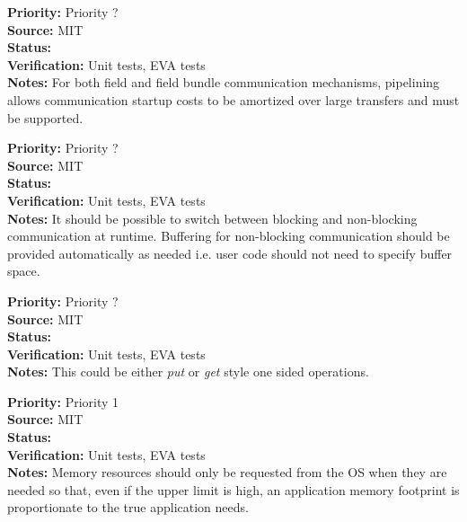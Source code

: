 \begin{reqlist}
{\bf Priority:} Priority ? \\
{\bf Source:}  MIT \\
{\bf Status:}  \\
{\bf Verification:} Unit tests, EVA tests \\
{\bf Notes:}
For both field and field bundle communication mechanisms, pipelining allows communication
startup costs to be amortized over large transfers and must be supported.
\end{reqlist}

\begin{reqlist}
{\bf Priority:} Priority ? \\
{\bf Source:}  MIT \\
{\bf Status:}  \\
{\bf Verification:} Unit tests, EVA tests \\
{\bf Notes:}
It should be possible to switch between blocking and non-blocking
communication at runtime. Buffering for non-blocking communication should
be provided automatically as needed i.e. user code should not need to
specify buffer space.
\end{reqlist}

\begin{reqlist}
{\bf Priority:} Priority ? \\
{\bf Source:}  MIT \\
{\bf Status:}  \\
{\bf Verification:} Unit tests, EVA tests \\
{\bf Notes:}
This could be either {\it put} or {\it get} style one sided operations.
\end{reqlist}



\begin{reqlist}
{\bf Priority:} Priority 1 \\
{\bf Source:}  MIT \\
{\bf Status:}  \\
{\bf Verification:} Unit tests, EVA tests \\
{\bf Notes:}
Memory resources should only be requested from the OS when they are needed so that,
even if the upper limit is high, an application memory footprint is proportionate
to the true application needs.
\end{reqlist}

